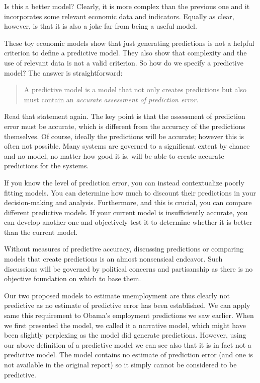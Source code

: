 \documentclass[]{memoir}
\begin{document}
Is this a better model? Clearly, it is more complex than the previous
one and it incorporates some relevant economic data and indicators.
Equally as clear, however, is that it is also a joke far from being a
useful model.

These toy economic models show that just generating predictions is not a
helpful criterion to define a predictive model. They also show that
complexity and the use of relevant data is not a valid criterion. So how
do we specify a predictive model? The answer is straightforward:

\begin{quote}
A predictive model is a model that not only creates predictions but also
must contain an \emph{accurate assessment of prediction error}.
\end{quote}

Read that statement again. The key point is that the assessment of
prediction error must be accurate, which is different from the accuracy
of the predictions themselves. Of course, ideally the predictions will
be accurate; however this is often not possible. Many systems are
governed to a significant extent by chance and no model, no matter how
good it is, will be able to create accurate predictions for the systems.

If you know the level of prediction error, you can instead contextualize
poorly fitting models. You can determine how much to discount their
predictions in your decision-making and analysis. Furthermore, and this
is crucial, you can compare different predictive models. If your current
model is insufficiently accurate, you can develop another one and
objectively test it to determine whether it is better than the current
model.

Without measures of predictive accuracy, discussing predictions or
comparing models that create predictions is an almost nonsensical
endeavor. Such discussions will be governed by political concerns and
partisanship as there is no objective foundation on which to base them.

Our two proposed models to estimate unemployment are thus clearly not
predictive as no estimate of predictive error has been established. We
can apply same this requirement to Obama's employment predictions we saw
earlier. When we first presented the model, we called it a narrative
model, which might have been slightly perplexing as the model did
generate predictions. However, using our above definition of a
predictive model we can see also that it is in fact not a predictive
model. The model contains no estimate of prediction error (and one is
not available in the original report) so it simply cannot be considered
to be predictive.
\end{document}

